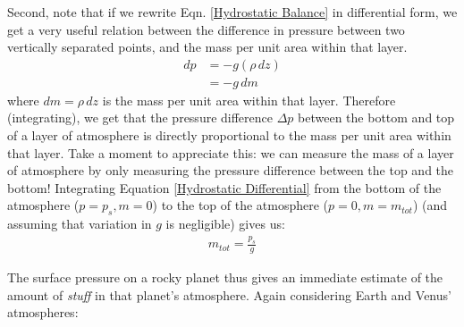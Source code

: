 Second, note that if we rewrite Eqn. \ref{Hydrostatic Balance} in differential form, we get a very useful relation between the difference in pressure between two vertically separated points, and the mass per unit area within that layer.
\begin{align}\label{Hydrostatic Differential}
    dp& =-g(\rho\, dz) \\
    & = -g \,dm\nonumber
\end{align}
where $dm=\rho\,dz$ is the mass per unit area within that layer. Therefore (integrating), we get that the pressure difference $\Delta p$ between the bottom and top of a layer of atmosphere is directly proportional to the mass per unit area within that layer. Take a moment to appreciate this: we can measure the mass of a layer of atmosphere by only measuring the pressure difference between the top and the bottom! Integrating Equation \ref{Hydrostatic Differential} from the bottom of the atmosphere ($p=p_s,m=0$) to the top of the atmosphere ($p=0,m=m_{tot}$) (and assuming that variation in $g$ is negligible) gives us:
\begin{align}\label{Total Mass Hydrostatic}
    m_{tot}=\frac{p_s}{g}
\end{align}

The surface pressure on a rocky planet thus gives an immediate estimate of the amount of \textit{stuff} in that planet's atmosphere. Again considering Earth and Venus' atmospheres:

